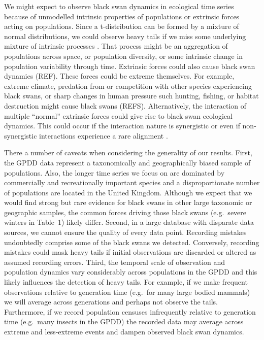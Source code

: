 We might expect to observe black swan dynamics in ecological time series
because of unmodelled intrinsic properties of populations or extrinsic forces
acting on populations. Since a t-distribution can be formed by a mixture of
normal distributions, we could observe heavy tails if we miss some underlying
mixture of intrinsic processes \citep{allen2001}. That process might be an
aggregation of populations across space, or population diversity, or some
intrinsic change in population variability through time. Extrinsic forces could
also cause black swan dynamics (REF). These forces could be extreme themselves.
For example, extreme climate, predation from or competition with other species
experiencing black swans, or sharp changes in human pressure such hunting,
fishing, or habitat destruction might cause black swans (REFS). Alternatively,
the interaction of multiple ``normal'' extrinsic forces could give rise to
black swan ecological dynamics. This could occur if the interaction nature is
synergistic \citep[e.g.][]{kirby2009} or even if non-synergistic interactions
experience a rare alignment \citep{denny2009}.

There a number of caveats when considering the generality of our results.
First, the GPDD data represent a taxonomically and geographically biased sample
of populations. Also, the longer time series we focus on are dominated by
commercially and recreationally important species and a disproportionate number
of populations are located in the United Kingdom. Although we expect that we
would find strong but rare evidence for black swans in other large taxonomic or
geographic samples, the common forces driving those black swans (e.g.~severe
winters in Table~1) likely differ. Second, in a large database with disparate
data sources, we cannot ensure the quality of every data point. Recording
mistakes undoubtedly comprise some of the black swans we detected. Conversely,
recording mistakes could mask heavy tails if initial observations are discarded
or altered as assumed recording errors. Third, the temporal scale of observation
and population dynamics vary considerably across populations in the GPDD and
this likely influences the detection of heavy tails. For example, if we make
frequent observations relative to generation time (e.g.~for many large bodied
mammals) we will average across generations and perhaps not observe the tails.
Furthermore, if we record population censuses infrequently relative to
generation time (e.g.~many insects in the GPDD) the recorded data may average
across extreme and less-extreme events and dampen observed black swan dynamics.

